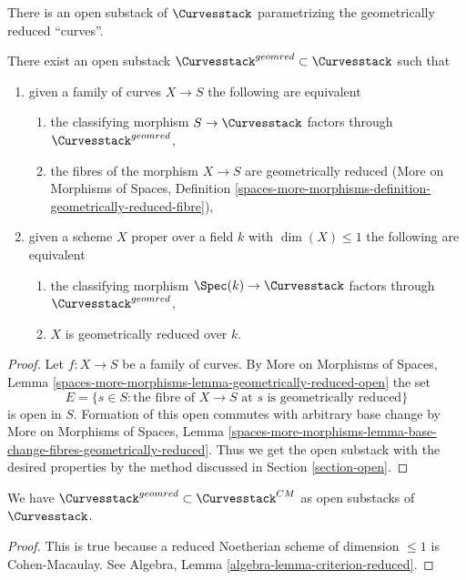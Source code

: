 \noindent
There is an open substack of $\Curvesstack$ parametrizing
the geometrically reduced ``curves''.

\begin{lemma}
\label{lemma-geometrically-reduced-curves}
There exist an open substack $\Curvesstack^{geomred} \subset \Curvesstack$
such that
\begin{enumerate}
\item given a family of curves $X \to S$ the following are equivalent
\begin{enumerate}
\item the classifying morphism $S \to \Curvesstack$ factors
through $\Curvesstack^{geomred}$,
\item the fibres of the morphism $X \to S$ are geometrically reduced
(More on Morphisms of Spaces, Definition
\ref{spaces-more-morphisms-definition-geometrically-reduced-fibre}),
\end{enumerate}
\item given a scheme $X$ proper over a field $k$ with $\dim(X) \leq 1$
the following are equivalent
\begin{enumerate}
\item the classifying morphism $\Spec(k) \to \Curvesstack$ factors
through $\Curvesstack^{geomred}$,
\item $X$ is geometrically reduced over $k$.
\end{enumerate}
\end{enumerate}
\end{lemma}

\begin{proof}
Let $f : X \to S$ be a family of curves. By
More on Morphisms of Spaces, Lemma
\ref{spaces-more-morphisms-lemma-geometrically-reduced-open}
the set
$$
E = \{s \in S : \text{the fibre of }X \to S\text{ at }s
\text{ is geometrically reduced}\}
$$
is open in $S$. Formation of this open commutes with arbitrary
base change by
More on Morphisms of Spaces, Lemma
\ref{spaces-more-morphisms-lemma-base-change-fibres-geometrically-reduced}.
Thus we get the open substack with the desired properties
by the method discussed in Section \ref{section-open}.
\end{proof}

\begin{lemma}
\label{lemma-geomred-in-CM}
We have $\Curvesstack^{geomred} \subset \Curvesstack^{CM}$
as open substacks of $\Curvesstack$.
\end{lemma}

\begin{proof}
This is true because a reduced Noetherian scheme of
dimension $\leq 1$ is Cohen-Macaulay. See
Algebra, Lemma \ref{algebra-lemma-criterion-reduced}.
\end{proof}






